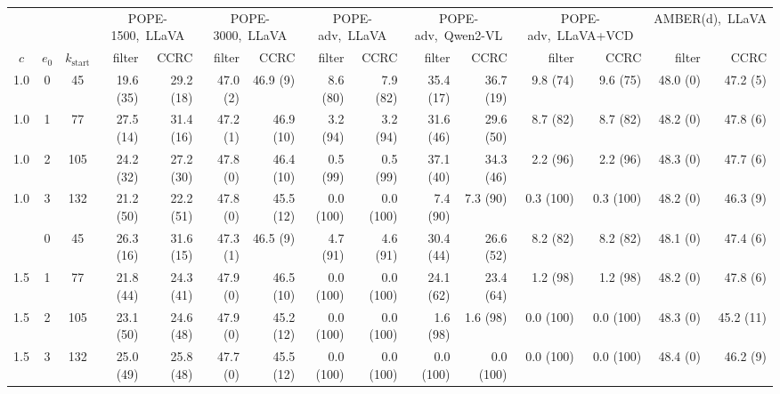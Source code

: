 \begin{tabular}{cccrrrrrrrrrrrr}
\toprule
 & & & \multicolumn{2}{c}{POPE-1500,~LLaVA} & \multicolumn{2}{c}{POPE-3000,~LLaVA} & \multicolumn{2}{c}{POPE-adv,~LLaVA} & \multicolumn{2}{c}{POPE-adv,~Qwen2-VL} & \multicolumn{2}{c}{POPE-adv,~LLaVA+VCD} & \multicolumn{2}{c}{AMBER(d),~LLaVA}\\
\cmidrule(lr){4-5}\cmidrule(lr){6-7}\cmidrule(lr){8-9}\cmidrule(lr){10-11}\cmidrule(lr){12-13}\cmidrule(lr){14-15}
$c$ & $e_0$ & $k_{\mathrm{start}}$ & filter & CCRC & filter & CCRC & filter & CCRC & filter & CCRC & filter & CCRC & filter & CCRC\\
\midrule
1.0 & 0 & 45 & 19.6 (35) & 29.2 (18) & 47.0 (2) & 46.9 (9) & 8.6 (80) & 7.9 (82) & 35.4 (17) & 36.7 (19) & 9.8 (74) & 9.6 (75) & 48.0 (0) & 47.2 (5)\\
1.0 & 1 & 77 & 27.5 (14) & 31.4 (16) & 47.2 (1) & 46.9 (10) & 3.2 (94) & 3.2 (94) & 31.6 (46) & 29.6 (50) & 8.7 (82) & 8.7 (82) & 48.2 (0) & 47.8 (6)\\
1.0 & 2 & 105 & 24.2 (32) & 27.2 (30) & 47.8 (0) & 46.4 (10) & 0.5 (99) & 0.5 (99) & 37.1 (40) & 34.3 (46) & 2.2 (96) & 2.2 (96) & 48.3 (0) & 47.7 (6)\\
1.0 & 3 & 132 & 21.2 (50) & 22.2 (51) & 47.8 (0) & 45.5 (12) & 0.0 (100) & 0.0 (100) & 7.4 (90) & 7.3 (90) & 0.3 (100) & 0.3 (100) & 48.2 (0) & 46.3 (9)\\
\addlinespace
1.5 & 0 & 45 & 26.3 (16) & 31.6 (15) & 47.3 (1) & 46.5 (9) & 4.7 (91) & 4.6 (91) & 30.4 (44) & 26.6 (52) & 8.2 (82) & 8.2 (82) & 48.1 (0) & 47.4 (6)\\
1.5 & 1 & 77 & 21.8 (44) & 24.3 (41) & 47.9 (0) & 46.5 (10) & 0.0 (100) & 0.0 (100) & 24.1 (62) & 23.4 (64) & 1.2 (98) & 1.2 (98) & 48.2 (0) & 47.8 (6)\\
1.5 & 2 & 105 & 23.1 (50) & 24.6 (48) & 47.9 (0) & 45.2 (12) & 0.0 (100) & 0.0 (100) & 1.6 (98) & 1.6 (98) & 0.0 (100) & 0.0 (100) & 48.3 (0) & 45.2 (11)\\
1.5 & 3 & 132 & 25.0 (49) & 25.8 (48) & 47.7 (0) & 45.5 (12) & 0.0 (100) & 0.0 (100) & 0.0 (100) & 0.0 (100) & 0.0 (100) & 0.0 (100) & 48.4 (0) & 46.2 (9)\\
\bottomrule
\end{tabular}
